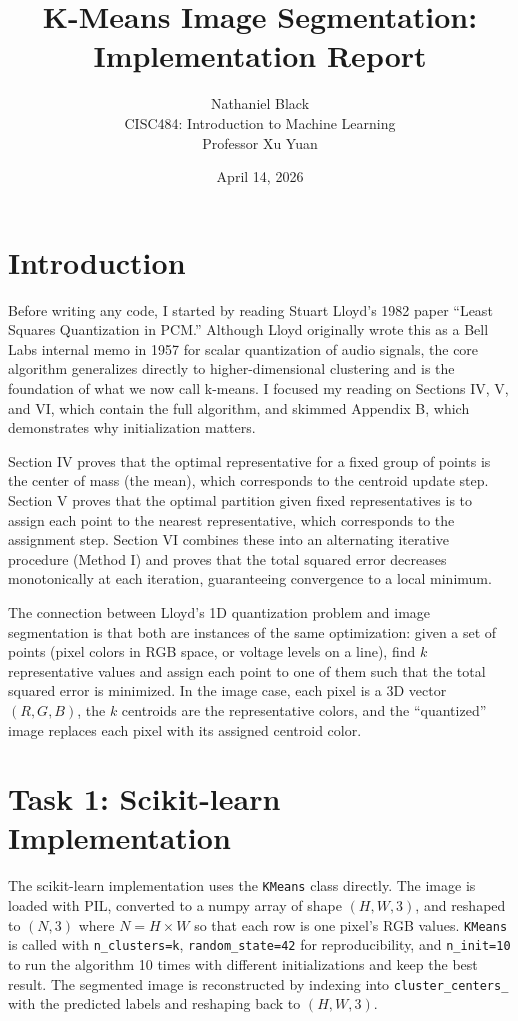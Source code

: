 \documentclass[12pt]{article}
\title{K-Means Image Segmentation: Implementation Report}
\author{Nathaniel Black \\ CISC484: Introduction to Machine Learning \\ Professor Xu Yuan}
\date{April 14, 2026}
\begin{document}
\maketitle

\section{Introduction}

Before writing any code, I started by reading Stuart Lloyd's 1982 paper
``Least Squares Quantization in PCM.'' Although Lloyd originally wrote this as
a Bell Labs internal memo in 1957 for scalar quantization of audio signals,
the core algorithm generalizes directly to higher-dimensional clustering and is
the foundation of what we now call k-means. I focused my reading on Sections
IV, V, and VI, which contain the full algorithm, and skimmed Appendix B, which
demonstrates why initialization matters.

Section IV proves that the optimal representative for a fixed group of points
is the center of mass (the mean), which corresponds to the centroid update
step. Section V proves that the optimal partition given fixed representatives
is to assign each point to the nearest representative, which corresponds to
the assignment step. Section VI combines these into an alternating iterative
procedure (Method I) and proves that the total squared error decreases
monotonically at each iteration, guaranteeing convergence to a local minimum.

The connection between Lloyd's 1D quantization problem and image segmentation
is that both are instances of the same optimization: given a set of points
(pixel colors in RGB space, or voltage levels on a line), find $k$
representative values and assign each point to one of them such that the total
squared error is minimized. In the image case, each pixel is a 3D vector
$(R, G, B)$, the $k$ centroids are the representative colors, and the
``quantized'' image replaces each pixel with its assigned centroid color.

\section{Task 1: Scikit-learn Implementation}

The scikit-learn implementation uses the \texttt{KMeans} class directly. The
image is loaded with PIL, converted to a numpy array of shape $(H, W, 3)$, and
reshaped to $(N, 3)$ where $N = H \times W$ so that each row is one pixel's
RGB values. \texttt{KMeans} is called with \texttt{n\_clusters=k},
\texttt{random\_state=42} for reproducibility, and \texttt{n\_init=10} to run
the algorithm 10 times with different initializations and keep the best
result. The segmented image is reconstructed by indexing into
\texttt{cluster\_centers\_} with the predicted labels and reshaping back to
$(H, W, 3)$.
\end{document}
